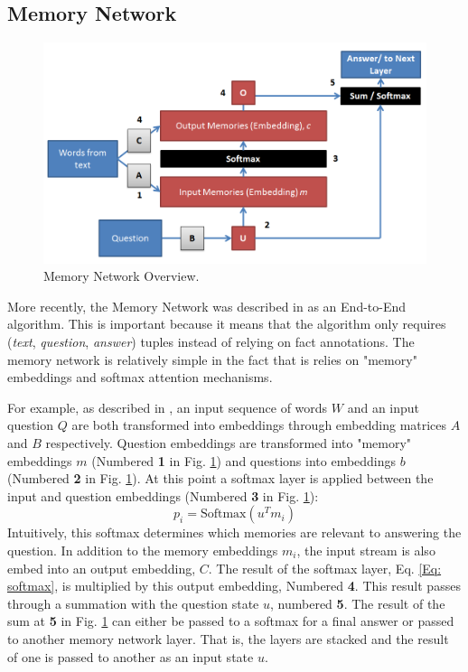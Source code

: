 \documentclass{article}
\begin{document}
\subsection{Memory Network}

\begin{figure}
  \centering
    \includegraphics[width=1\textwidth]{images/mem_net}
      \caption{Memory Network Overview.}    
      \label{Fig:mem_net}      
\end{figure}

More recently, the Memory Network was described in \cite{mem_net} as an End-to-End algorithm.  This is important because it means that the algorithm only requires (\textit{text}, \textit{question}, \textit{answer}) tuples instead of relying on fact annotations.  The memory network is relatively simple in the fact that is relies on "memory" embeddings and softmax attention mechanisms. \par

For example, as described in \cite{mem_net}, an input sequence of words $W$ and an input question $Q$ are both transformed into embeddings through embedding matrices $A$ and $B$ respectively.  Question embeddings are transformed into "memory" embeddings $m$ (Numbered \textbf{1} in Fig. \ref{Fig:mem_net}) and questions into embeddings $b$ (Numbered \textbf{2} in Fig. \ref{Fig:mem_net}).  At this point a softmax layer is applied between the input and question embeddings (Numbered \textbf{3} in Fig. \ref{Fig:mem_net}): 
\begin{equation}
\label{Eq: softmax}
p_i = \text{Softmax} \left( u^Tm_i\right)
\end{equation}
Intuitively, this softmax determines which memories are relevant to answering the question.  In addition to the memory embeddings $m_i$, the input stream is also embed into an output embedding, $C$.  The result of the softmax layer, Eq. \ref{Eq: softmax}, is multiplied by this output embedding, Numbered \textbf{4}.  This result passes through a summation with the question state $u$, numbered \textbf{5}.  The result of the sum at \textbf{5} in Fig. \ref{Fig:mem_net} can either be passed to a softmax for a final answer or passed to another memory network layer.  That is, the layers are stacked and the result of one is passed to another as an input state $u$.  
\end{document}
